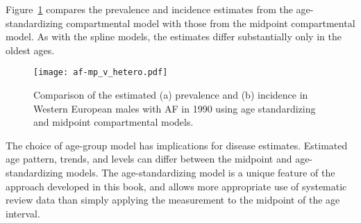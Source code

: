 Figure~\ref{fig:app-af compare} compares the prevalence and incidence
estimates from the age-standardizing compartmental model with those from the
midpoint compartmental model.  As with the spline models, the
estimates differ substantially only in the oldest ages.

    \begin{figure}[h]
        \begin{center}
            \texttt{[image: af-mp\_v\_hetero.pdf]}
            \caption{Comparison of the estimated (a) prevalence and (b) incidence
              in Western European males with AF in 1990
              using age standardizing and midpoint compartmental models.}
            \label{fig:app-af compare}
        \end{center}
    \end{figure}

The choice of age-group model has implications for disease estimates.
Estimated age pattern, trends, and levels can differ between the
midpoint and age-standardizing models.  The age-standardizing model is a
unique feature of the approach developed in this book,
and allows more appropriate use of systematic review data than simply
applying the measurement to the midpoint of the age interval.
